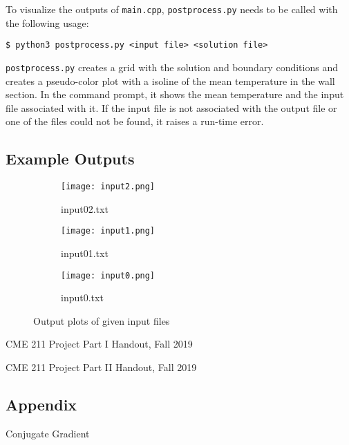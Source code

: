 \documentclass[10pt]{article}
\begin{document}
To visualize the outputs of \texttt{main.cpp}, \texttt{postprocess.py} needs to be called with the following usage:

\texttt{\$ python3 postprocess.py <input file> <solution file>}

\texttt{postprocess.py} creates a grid with the solution and boundary conditions and creates a pseudo-color plot with a isoline of the mean temperature in the wall section. In the command prompt, it shows the mean temperature and the input file associated with it. If the input file is not associated with the output file or one of the files could not be found, it raises a run-time error.

\subsection*{Example Outputs}

\begin{figure}[h!]
  \centering
  \begin{subfigure}[b]{0.45\linewidth}
    \texttt{[image: input2.png]}
     \caption{input02.txt}
  \end{subfigure}
  \begin{subfigure}[b]{0.45\linewidth}
    \texttt{[image: input1.png]}
    \caption{input01.txt}
  \end{subfigure}
  \begin{subfigure}[b]{0.35\linewidth}
    \texttt{[image: input0.png]}
    \caption{input0.txt}
  \end{subfigure}
  \caption{Output plots of given input files}
  \label{fig:coffee3}
\end{figure}

\clearpage

\begin{thebibliography}{9}
CME 211 Project Part I Handout, Fall 2019

CME 211 Project Part II Handout, Fall 2019
\end{thebibliography}
\subsection{Appendix}
\begin{algorithm}
\DontPrintSemicolon
{} 
\caption{Conjugate Gradient}
\end{algorithm}
\end{document}
